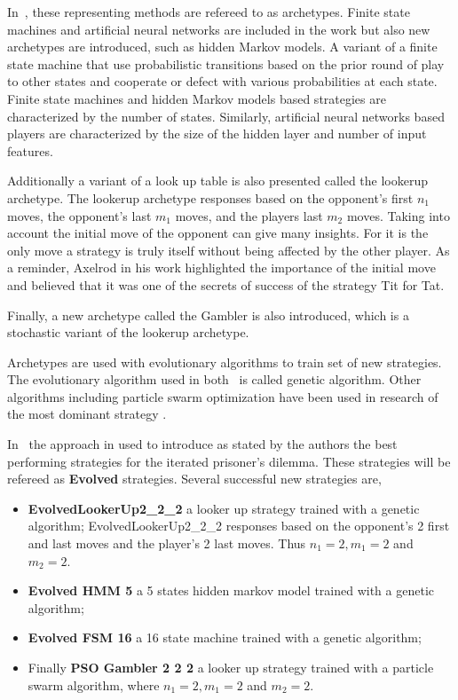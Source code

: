 \documentclass{article}
\begin{document}
In~\cite{Knight2017}, these representing methods are refereed to as archetypes.
Finite state machines and artificial neural networks are included in the
work but also new archetypes are introduced, such as hidden Markov models. A variant
of a finite state machine that use probabilistic transitions based on the prior
round of play to other states and cooperate or defect with various probabilities
at each state. Finite state machines and hidden Markov models 
based strategies are characterized
by the number of states. Similarly, artificial neural networks based players
are characterized by the size of the hidden layer and number of input features.

Additionally a variant of a look up table is also presented called the lookerup 
archetype. The lookerup archetype responses based on the opponent's first \(n_1\)
moves, the opponent's last \(m_1\) moves, and the players last \(m_2\) moves.
Taking into account the initial move of the opponent can give many insights. 
For it is the only move a strategy is truly itself without being affected by
the other player. As a reminder, Axelrod in his work 
highlighted the importance of the initial move and believed that it was one
of the secrets of success of the strategy Tit for Tat.

Finally, a new archetype called the Gambler is also introduced, which is a 
stochastic variant of the lookerup archetype.

Archetypes are used with evolutionary algorithms to train set of 
new strategies. The evolutionary algorithm used in both~\cite{Axelrod1987,
Gaudesi2016} is called genetic algorithm. Other algorithms including particle
swarm optimization have been used in research of the most dominant strategy
\cite{Franken2005}.

In~\cite{Knight2017} the approach in used to introduce as stated
by the authors the best performing strategies for the iterated prisoner's dilemma.
These strategies will be refereed  as \textbf{Evolved} strategies.
Several successful new strategies are,

\begin{itemize}
    \item \textbf{EvolvedLookerUp2\_2\_2} a looker up strategy trained with a
    genetic algorithm; EvolvedLookerUp2\_2\_2 responses based on the opponent's 
    2 first and last moves and the player's 2 last moves. Thus \(n_1=2, m_1=2\)
    and \(m_2=2\). 
    \item \textbf{Evolved HMM 5} a 5 states hidden markov model trained with a genetic 
    algorithm;
    \item \textbf{Evolved FSM 16} a 16 state machine trained with a genetic
    algorithm; 
    \item Finally \textbf{PSO Gambler 2 2 2} a looker up strategy trained with
    a particle swarm algorithm, where \(n_1=2, m_1=2\) and \(m_2=2\).
\end{itemize}
\end{document}
